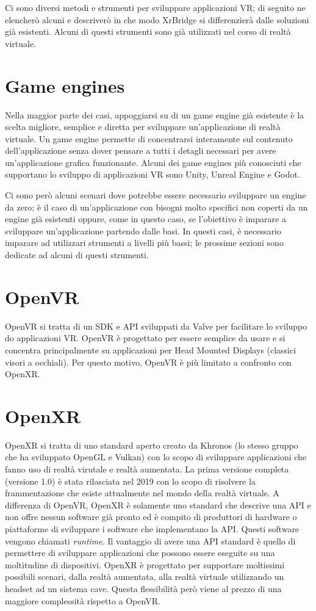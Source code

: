 \documentclass[twoside]{supsistudent}
\begin{document}
Ci sono diversi metodi e strumenti per sviluppare applicazioni VR; di seguito ne elencherò alcuni e descriverò in che modo XrBridge si differenzierà dalle soluzioni già esistenti. Alcuni di questi strumenti sono già utilizzati nel corso di realtà virtuale.

\section{Game engines}

Nella maggior parte dei casi, appoggiarsi su di un game engine già esistente è la scelta migliore, semplice e diretta per sviluppare un'applicazione di realtà virtuale. Un game engine permette di concentrarsi interamente sul contenuto dell'applicazione senza dover pensare a tutti i detagli necessari per avere un'applicazione grafica funzionante. Alcuni dei game engines più conosciuti che supportano lo sviluppo di applicazioni VR sono Unity, Unreal Engine e Godot.

Ci sono però alcuni scenari dove potrebbe essere necessario sviluppare un engine da zero; è il caso di un'applicazione con bisogni molto specifici non coperti da un engine già esistenti oppure, come in questo caso, se l'obiettivo è imparare a sviluppare un'applicazione partendo dalle basi. In questi casi, è necessario imparare ad utilizzari strumenti a livelli più bassi; le prossime sezioni sono dedicate ad alcuni di questi strumenti.

\section{OpenVR}

OpenVR si tratta di un SDK e API sviluppati da Valve per facilitare lo sviluppo do applicazioni VR. OpenVR è progettato per essere semplice da usare e si concentra principalmente su applicazioni per Head Mounted Displays (classici visori a occhiali). Per questo motivo, OpenVR è più limitato a confronto con OpenXR.

\section{OpenXR}

OpenXR si tratta di uno standard aperto creato da Khronos (lo stesso gruppo che ha sviluppato OpenGL e Vulkan) con lo scopo di sviluppare applicazioni che fanno uso di realtà virutale e realtà aumentata. La prima versione completa (versione 1.0) è stata rilasciata nel 2019 con lo scopo di risolvere la frammentazione che esiste attualmente nel mondo della realtà virtuale. A differenza di OpenVR, OpenXR è solamente uno standard che descrive una API e non offre nessun software già pronto ed è compito di produttori di hardware o piattaforme di sviluppare i software che implementano la API. Questi software vengono chiamati \textit{runtime}. Il vantaggio di avere una API standard è quello di permettere di sviluppare applicazioni che possono essere eseguite su una moltitudine di dispositivi. OpenXR è progettato per supportare moltissimi possibili scenari, dalla realtà aumentata, alla realtà virtuale utilizzando un headset ad un sistema cave. Questa flessibilità però viene al prezzo di una maggiore complessità rispetto a OpenVR.
\end{document}
